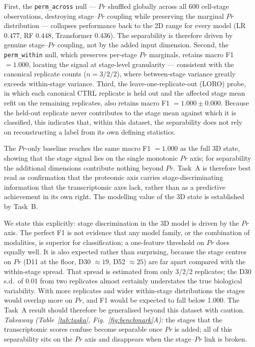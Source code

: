\documentclass[5p,times,twocolumn]{elsarticle}
\newcommand{\rtag}[1]{}
\newcommand{\rev}[2]{\rtag{#1}#2}
\newenvironment{revblock}[1]{\par\rtag{#1}\ignorespaces}{\par}
\begin{document}
First, the \texttt{perm\_across} null --- $Pr$ shuffled globally
across all 600 cell-stage observations, destroying stage--$Pr$
coupling while preserving the marginal $Pr$ distribution ---
collapses performance back to the 2D range for every model
(LR $0.477$, RF $0.448$, Transformer $0.436$).
The separability is therefore driven by genuine stage--$Pr$
coupling, not by the added input dimension.
Second, the \texttt{perm\_within} null, which preserves per-stage
$Pr$ marginals, retains macro F1 $= 1.000$, locating the signal
at stage-level granularity --- consistent with the canonical
replicate counts ($n = 3/2/2$), where between-stage variance
greatly exceeds within-stage variance.
Third, the leave-one-replicate-out (LORO) probe, in which each
canonical CTRL replicate is held out and the affected stage mean
refit on the remaining replicates, also retains macro F1
$= 1.000 \pm 0.000$.
Because the held-out replicate never contributes to the stage
mean against which it is classified, this \rev{R1.3}{indicates that,
  within this dataset, the separability does not rely on}
reconstructing a label from its own defining statistics.

The $Pr$-only baseline reaches the same macro F1 $= 1.000$ as
the full 3D state, showing that the stage signal lies on the
single monotonic $Pr$ axis; for separability the additional
dimensions contribute nothing beyond $Pr$.
Task~A is therefore best read as confirmation that the proteomic
axis carries stage-discriminating information \rev{AC}{that the
  transcriptomic axes lack}, rather than
as a predictive achievement in its own right.
The modelling value of the 3D state is established by Task~B.
\begin{revblock}{R2.12,R1.8,R1.5}
  We state this explicitly: stage discrimination in the 3D model
  is driven by the $Pr$ axis. The perfect F1 is not evidence that
  any model family, or the combination of modalities, is superior
  for classification; a one-feature threshold on $Pr$ does equally
  well. It is also expected rather than surprising, because the
  stage centres on $Pr$ (D11 at the floor, D30 $\approx 19$,
  D52 $\approx 25$) are far apart compared with the within-stage
  spread. That spread is estimated from only 3/2/2 replicates;
  the D30 s.d.\ of 0.01 from two replicates almost certainly
  understates the true biological variability. With more
  replicates and wider within-stage distributions the stages would
  overlap more on $Pr$, and F1 would be expected to fall below
  1.000. The Task~A result should therefore be generalised beyond
  this dataset with caution.
  \textit{Takeaway (Table~\ref{tab:taska},
    Fig.~\ref{fig:benchmark}A):} the stages that the transcriptomic
  scores confuse become separable once $Pr$ is added; all of this
  separability sits on the $Pr$ axis and disappears when the
  stage--$Pr$ link is broken.
\end{revblock}
\end{document}
